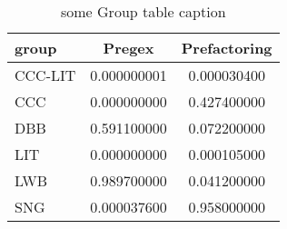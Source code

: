 \begin{table}\begin{small}\begin{center}\caption{some Group table caption}\label{table:groupANOVATable}\begin{tabular}
{lcc}
group & Pregex & Prefactoring \\
\toprule[0.16em]
CCC-LIT & 0.000000001 & 0.000030400\\
CCC & 0.000000000 & 0.427400000\\
DBB & 0.591100000 & 0.072200000\\
LIT & 0.000000000 & 0.000105000\\
LWB & 0.989700000 & 0.041200000\\
SNG & 0.000037600 & 0.958000000\\
\bottomrule[0.13em]\end{tabular}\end{center}\end{small}\end{table}
